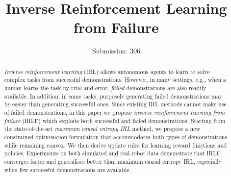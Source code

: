 \documentclass{aamas2016}
\begin{document}
%
\title{Inverse Reinforcement Learning from Failure}
\author{Submission: 306}
\maketitle
\begin{abstract}

\emph{Inverse reinforcement learning} (IRL) allows autonomous agents to learn to solve complex tasks from successful demonstrations.  However, in many settings, e.g., when a human learns the task by trial and error, \emph{failed} demonstrations are also readily available.  In addition, in some tasks, purposely generating failed demonstrations may be easier than generating successful ones.  Since existing IRL methods cannot make use of failed demonstrations, in this paper we propose \emph{inverse reinforcement learning from failure} (IRLF) which exploits both successful and failed demonstrations.  Starting from the state-of-the-art \emph{maximum causal entropy IRL} method, we propose a new constrained optimisation formulation that accommodates both types of demonstrations while remaining convex.  We then derive update rules for learning reward functions and policies. Experiments on both simulated and real-robot data demonstrate that IRLF converges faster and generalises better than maximum causal entropy IRL, especially when few successful demonstrations are available.
\end{abstract}




\end{document}

